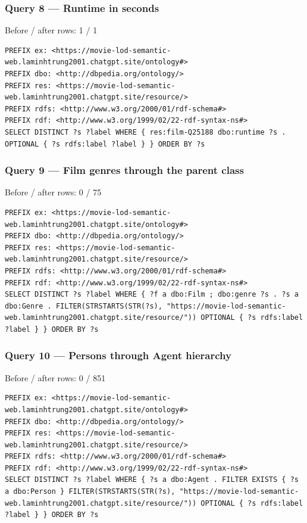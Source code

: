 \documentclass[
  11pt,
]{article}
\begin{document}
\subsubsection{Query 8 --- Runtime in
seconds}\label{query-8-runtime-in-seconds}

Before / after rows: 1 / 1

\begin{verbatim}
PREFIX ex: <https://movie-lod-semantic-web.laminhtrung2001.chatgpt.site/ontology#>
PREFIX dbo: <http://dbpedia.org/ontology/>
PREFIX res: <https://movie-lod-semantic-web.laminhtrung2001.chatgpt.site/resource/>
PREFIX rdfs: <http://www.w3.org/2000/01/rdf-schema#>
PREFIX rdf: <http://www.w3.org/1999/02/22-rdf-syntax-ns#>
SELECT DISTINCT ?s ?label WHERE { res:film-Q25188 dbo:runtime ?s . OPTIONAL { ?s rdfs:label ?label } } ORDER BY ?s
\end{verbatim}

\subsubsection{Query 9 --- Film genres through the parent
class}\label{query-9-film-genres-through-the-parent-class}

Before / after rows: 0 / 75

\begin{verbatim}
PREFIX ex: <https://movie-lod-semantic-web.laminhtrung2001.chatgpt.site/ontology#>
PREFIX dbo: <http://dbpedia.org/ontology/>
PREFIX res: <https://movie-lod-semantic-web.laminhtrung2001.chatgpt.site/resource/>
PREFIX rdfs: <http://www.w3.org/2000/01/rdf-schema#>
PREFIX rdf: <http://www.w3.org/1999/02/22-rdf-syntax-ns#>
SELECT DISTINCT ?s ?label WHERE { ?f a dbo:Film ; dbo:genre ?s . ?s a dbo:Genre . FILTER(STRSTARTS(STR(?s), "https://movie-lod-semantic-web.laminhtrung2001.chatgpt.site/resource/")) OPTIONAL { ?s rdfs:label ?label } } ORDER BY ?s
\end{verbatim}

\subsubsection{Query 10 --- Persons through Agent
hierarchy}\label{query-10-persons-through-agent-hierarchy}

Before / after rows: 0 / 851

\begin{verbatim}
PREFIX ex: <https://movie-lod-semantic-web.laminhtrung2001.chatgpt.site/ontology#>
PREFIX dbo: <http://dbpedia.org/ontology/>
PREFIX res: <https://movie-lod-semantic-web.laminhtrung2001.chatgpt.site/resource/>
PREFIX rdfs: <http://www.w3.org/2000/01/rdf-schema#>
PREFIX rdf: <http://www.w3.org/1999/02/22-rdf-syntax-ns#>
SELECT DISTINCT ?s ?label WHERE { ?s a dbo:Agent . FILTER EXISTS { ?s a dbo:Person } FILTER(STRSTARTS(STR(?s), "https://movie-lod-semantic-web.laminhtrung2001.chatgpt.site/resource/")) OPTIONAL { ?s rdfs:label ?label } } ORDER BY ?s
\end{verbatim}
\end{document}
